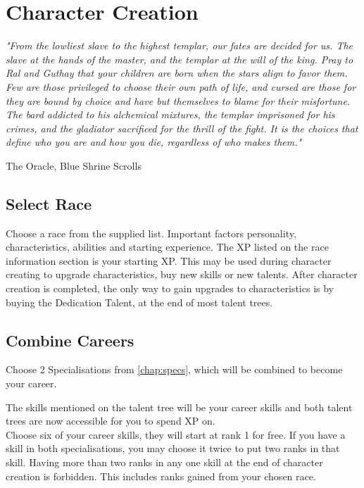 \chapter{Character Creation}\label{chap:creation}

\epigraph{\textit{
    "From the lowliest slave to the highest templar, our fates are decided for us. The slave at the hands of the master, and the
    templar at the will of the king. Pray to Ral and Guthay that your children are born when the stars align to favor them.
    Few are those privileged to choose their own path of life, and cursed are those for they are bound by choice and have but
    themselves to blame for their misfortune. The bard addicted to his alchemical mixtures, the templar imprisoned for his
    crimes, and the gladiator sacrificed for the thrill of the fight. It is the choices that define who you are and how you die,
    regardless of who makes them." } } { The Oracle, Blue Shrine Scrolls }

\begin{multicols}{2}
\section{Select Race}
Choose a race from the supplied list. Important factors personality, characteristics, abilities and starting experience.
The XP listed on the race information section is your starting XP. This may be used during character creating to upgrade characteristics, buy new skills or new talents.
After character creation is completed, the only way to gain upgrades to characteristics is by buying the Dedication Talent, at the end of most talent trees.

\section{Combine Careers}
Choose 2 Specialisations from \cref{chap:specs}, which will be combined to become your career.

The skills mentioned on the talent tree will be your career skills and both talent
trees are now accessible for you to spend XP on.\\
Choose six of your career skills, they will start at rank 1 for free. If you have
a skill in both specialisations, you may choose it twice to put two ranks in that
skill. Having more than two ranks in any one skill at the end of character creation
is forbidden. This includes ranks gained from your chosen race.
\end{multicols}

